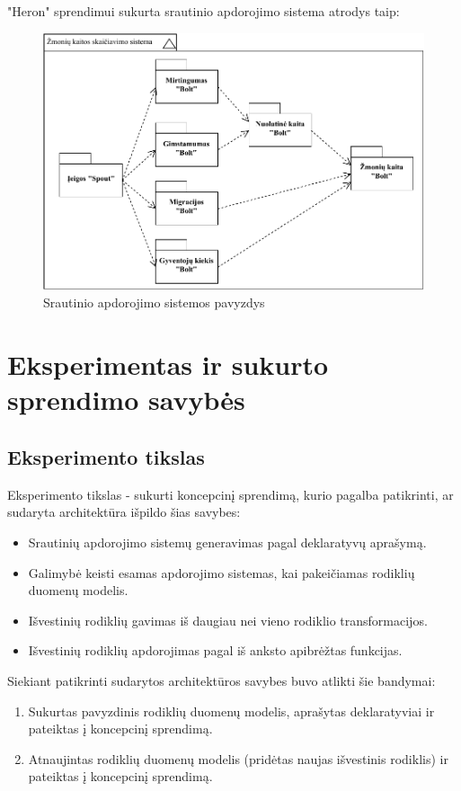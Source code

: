 \documentclass{VUMIFPSbakalaurinis}
\begin{document}
"Heron" sprendimui sukurta srautinio apdorojimo sistema atrodys taip:
\begin{figure}[H]
    \centering
    \includegraphics[width=1\textwidth]{img/generuota_sistema.pdf}
    \caption{Srautinio apdorojimo sistemos pavyzdys}
    \label{img:example}
\end{figure}

\section{Eksperimentas ir sukurto sprendimo savybės}

\subsection{Eksperimento tikslas}

Eksperimento tikslas - sukurti koncepcinį sprendimą, kurio pagalba patikrinti, ar sudaryta architektūra išpildo šias savybes:
\begin{itemize}
    \item Srautinių apdorojimo sistemų generavimas pagal deklaratyvų aprašymą.
    \item Galimybė keisti esamas apdorojimo sistemas, kai pakeičiamas rodiklių duomenų modelis.
    \item Išvestinių rodiklių gavimas iš daugiau nei vieno rodiklio transformacijos.
    \item Išvestinių rodiklių apdorojimas pagal iš anksto apibrėžtas funkcijas.
\end{itemize}  

\noindent Siekiant patikrinti sudarytos architektūros savybes buvo atlikti šie bandymai:
\begin{enumerate}
    \item Sukurtas pavyzdinis rodiklių duomenų modelis, aprašytas deklaratyviai ir pateiktas į koncepcinį sprendimą.
    \item Atnaujintas rodiklių duomenų modelis (pridėtas naujas išvestinis rodiklis) ir pateiktas į koncepcinį sprendimą.
\end{enumerate}
\end{document}
